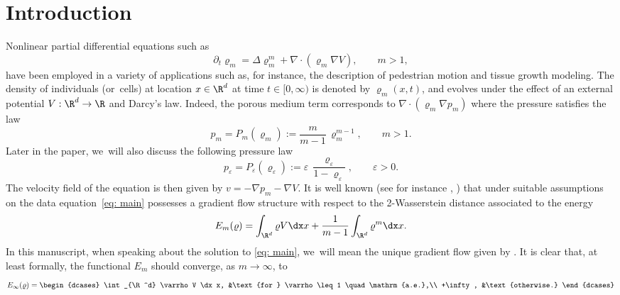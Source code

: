 \section{Introduction}

Nonlinear partial differential equations such as
\begin{equation}\label{eq: main}
\partial_{t} \varrho_m = \Delta \varrho_m^m + \nabla \cdot (\varrho_m \nabla V), \qquad m>1,
\end{equation}
have been employed in a variety of applications such as, for instance, the description of pedestrian motion and tissue growth modeling. The density of individuals (or~cells) at location $x\in\R^d$ at time $t \in [0,\infty)$ is denoted by $\varrho_m(x,t)$, and evolves under the effect of an external potential $V:\R^d\to\R$ and Darcy's law. Indeed, the porous medium term corresponds to $\nabla \cdot(\varrho_m\nabla p_m)$ where the pressure satisfies the law
\begin{equation}\label{eq: pressure power law}
p_m= P_m(\varrho_m):=\frac{m}{m-1}\, \varrho_m^{m-1}, \qquad m>1.
\end{equation}
Later in the paper, we~will also discuss the following pressure law
\begin{equation}
\label{singular pressure}
p_\varepsilon= P_\varepsilon(\varrho_\varepsilon):= \varepsilon\, \frac{\varrho_\varepsilon}{1-\varrho_\varepsilon}, \qquad \varepsilon>0.
\end{equation}
The velocity field of the equation is then given by $v = -\nabla p_m -\nabla V$.
It is well known (see for instance \cite[Th.\,11.2.8]{AGS2008}, \cite{Otto}) that under suitable assumptions on the data equation~\eqref{eq: main} possesses a gradient flow structure with respect to the 2\nobreakdash-Wasserstein distance associated to the energy
\begin{equation*}
\label{eq: energy}
E_m(\varrho)= \int_{\R^d} \varrho V \dx x + \frac{1}{m-1}\int_{\R^d} \varrho^m \dx x.
\end{equation*}
In this manuscript, when speaking about the solution to \eqref{eq: main}, we~will mean the unique gradient flow given by \cite[Th.\,11.2.8]{AGS2008}.
It is clear that, at least formally, the functional $E_m$ should converge, as $m\to\infty$, to
\begin{equation*}\label{eq: energy infty}
E_\infty(\varrho)=
\begin{dcases}
\int_{\R^d} \varrho V \dx x, &\text{for } \varrho\leq 1 \quad\mathrm{a.e.},\\
+\infty, &\text{otherwise.}
\end{dcases}
\end{equation*}
